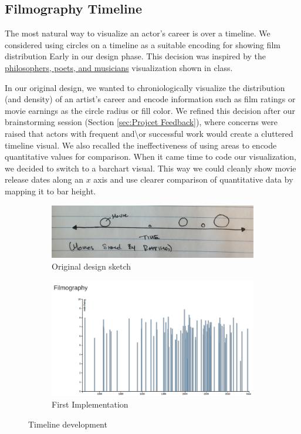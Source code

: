 \documentclass[12pt]{article}
\begin{document}
\newpage

\subsection{Filmography Timeline}


The most natural way to visualize an actor's career is over a timeline.  We considered using circles on a timeline as a suitable encoding for showing film distribution Early in our design phase.  This decision was inspired by the \href{http://mariandoerk.de/edgemaps/demo/#phils;time;;;}{philosophers, poets, and musicians}  visualization shown in class. 

In our original design, we wanted to chroniologically visualize the distribution (and density) of an artist's career and encode information such as film ratings or movie earnings as the circle radius or fill color.   We refined this decision after our brainstorming session (Section \ref{sec:Projcet Feedback}), where concerns were raised that actors with frequent and\textbackslash or successful work would create a cluttered timeline visual.  We also recalled the ineffectiveness of using areas to encode quantitative values for comparison.  When it came time to code our visualization, we decided to switch to a barchart visual.  This way we could cleanly show movie release dates along an $x$ axis and use clearer comparison of quantitative data by mapping it to bar height.

	\begin{figure}[h!]
			\centering
			\begin{subfigure}[t]{.5\textwidth}
			  \centering
			  \includegraphics[width=\linewidth]{images/timeline_orig.png}
			  \caption{Original design sketch}
			  \label{fig:timelineA}
			\end{subfigure}%
			\begin{subfigure}[t]{.5\textwidth}
			  \centering
			  \includegraphics[width=.7\linewidth]{images/timeline_crop_waits.png}
			  \caption{First Implementation}
			  \label{fig:timelineB}
			\end{subfigure}%
			\caption{Timeline development}
			\label{fig:timeline}
		\end{figure}
		
\end{document}
